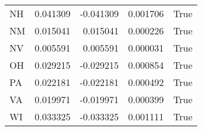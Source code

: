 \begin{table}
\begin{tabular}{lrrrl}
      NH &   0.041309 & -0.041309 &       0.001706 &          True \\
      NM &   0.015041 &  0.015041 &       0.000226 &          True \\
      NV &   0.005591 &  0.005591 &       0.000031 &          True \\
      OH &   0.029215 & -0.029215 &       0.000854 &          True \\
      PA &   0.022181 & -0.022181 &       0.000492 &          True \\
      VA &   0.019971 & -0.019971 &       0.000399 &          True \\
      WI &   0.033325 & -0.033325 &       0.001111 &          True \\
\bottomrule
\end{tabular}
\end{table}
